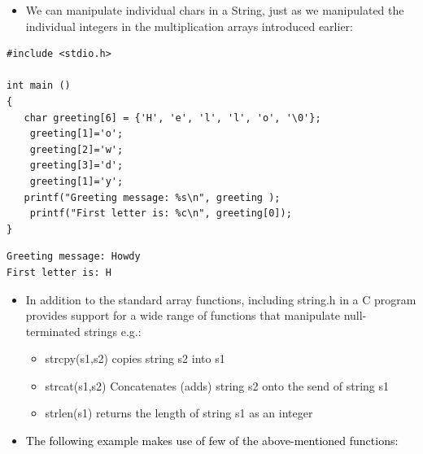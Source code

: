 \documentclass{beamer}
\begin{document}
\begin{frame}[fragile]
\begin{itemize}

\item {\color{black}
We can manipulate individual chars in a String, just as we manipulated the individual integers in
the multiplication arrays introduced earlier:}

\end{itemize}
\end{frame}

\begin{frame}[fragile]

\begin{block}{}
\begin{lstlisting}
#include <stdio.h>

int main ()
{
   char greeting[6] = {'H', 'e', 'l', 'l', 'o', '\0'};
    greeting[1]='o';
    greeting[2]='w';	
    greeting[3]='d';
    greeting[1]='y';
   printf("Greeting message: %s\n", greeting );	
    printf("First letter is: %c\n", greeting[0]);	
}

\end{lstlisting}
\end{block}

\begin{block}{}
\begin{lstlisting}
Greeting message: Howdy
First letter is: H

\end{lstlisting}
\end{block}
\end{frame}

\begin{frame}[fragile]
\begin{itemize}

\item {\color{black}
In addition to the standard array functions, including string.h in a C program provides support for a wide range of
functions that manipulate null-terminated strings e.g.:}

\begin{itemize}
\item {\color{black}
strcpy(s1,s2) copies string s2 into s1}
\item {\color{black}
strcat(s1,s2) Concatenates (adds) string s2 onto the send of string s1}
\item {\color{black}
strlen(s1) returns the length of string s1 as an integer}
\end{itemize}
\end{itemize}
\begin{itemize}
\item \textcolor{black}{The f}\textcolor{black}{ollowing example makes use of few of the above-mentioned functions:}
\end{itemize}
\end{frame}
\end{document}
